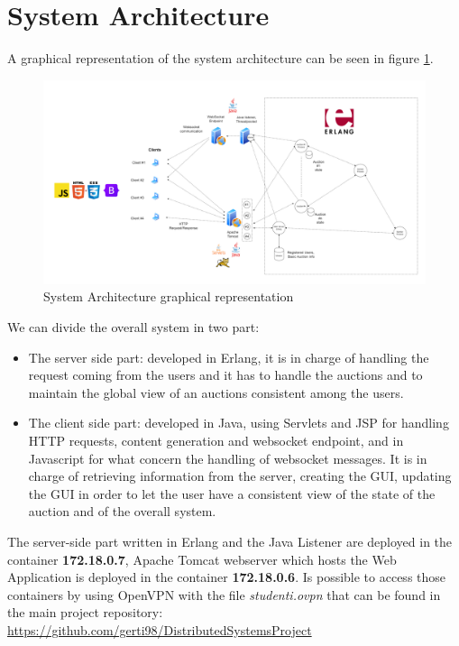 \section{System Architecture}
\noindent A graphical representation of the system architecture can be seen in figure \ref{fig:architecture}.

\begin{figure}[H]
	\centering
	\includegraphics[width=1\linewidth]{img/systemStructure2.png}
	\caption{System Architecture graphical representation}
	\label{fig:architecture}
\end{figure}

\noindent We can divide the overall system in two part:
\begin{itemize}
	\item The server side part: developed in Erlang, it is in charge of handling the request coming from the users and it has to handle the auctions and to maintain the global view of an auctions consistent among the users.
	
	\item The client side part: developed in Java, using Servlets and JSP for handling HTTP requests, content generation and websocket endpoint, and in Javascript for what concern the handling of websocket messages. It is in charge of retrieving information from the server, creating the GUI, updating the GUI in order to let the user have a consistent view of the state of the auction and of the overall system.
\end{itemize}

\noindent The server-side part written in Erlang and the Java Listener are deployed in the container \textbf{172.18.0.7}, Apache Tomcat webserver which hosts the Web Application is deployed in the container \textbf{172.18.0.6}.
Is possible to access those containers by using OpenVPN with the file \textit{studenti.ovpn} that can be found
in the main project repository: \\
\url{https://github.com/gerti98/DistributedSystemsProject}
	
